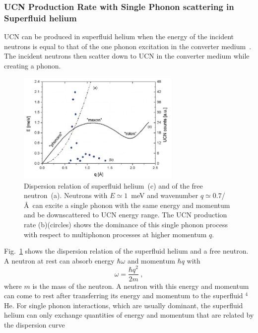 \subsubsection{UCN Production Rate with Single Phonon scattering in
  Superfluid
  helium\label{sec:UCN_production}}
UCN can be produced in superfluid helium when the energy of the
incident neutrons is equal to that of the one phonon excitation in the
converter medium~\cite{Korobkina2002,Schmidt2009,Golub77}. The
incident neutrons then scatter down to UCN in the converter medium
while creating a phonon.
\begin{figure}[h!]
\begin{center}
   \includegraphics[width=0.7\textwidth]{FIG1_2.PNG}
   \caption[Free neutron and superfluid helium dispersion
   relation]{\cite{PSI_news} Dispersion relation of superfluid
     helium~(c) and of the free neutron~(a). Neutrons with
     $E\simeq 1$~meV and wavenumber $q \simeq 0.7$/\AA~can excite a
     single phonon with the same energy and momentum and be
     downscattered to UCN energy range. The UCN production rate
     (b)(circles) shows the dominance of this single phonon process
     with respect to multiphonon processes at higher momentum $q$.
    }
    \label{fig:FIG1}
    \end{center}
\end{figure} 
Fig.~\ref{fig:FIG1} shows the dispersion relation of the superfluid
helium and a free neutron. A neutron at rest can absorb energy $\hbar
\omega$ and momentum $\hbar q$ with
\begin{equation}
\label{neutron_energy}
\omega=\frac{\hbar q^2}{2m}~,
\end{equation}
where $m$ is the mass of the neutron. A neutron with this energy and
momentum can come to rest after transferring its energy and momentum
to the superfluid $^4$He. For single phonon interactions, which are
usually dominant, the superfluid helium can only exchange quantities
of energy and momentum that are related by the dispersion curve

